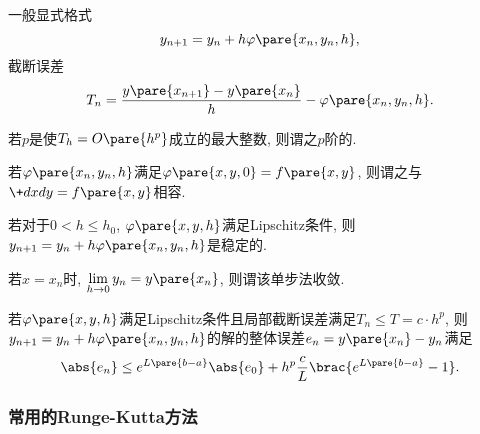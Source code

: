 \documentclass[hidelinks]{ctexart}
\begin{document}
一般显式格式
\[ y_{n+1} = y_n + h\varphi\pare{x_n,y_n,h}, \]
截断误差
\[ T_n = \frac{y\pare{x_{n+1}} - y\pare{x_n}}{h} - \varphi\pare{x_n,y_n,h}. \]
\begin{definition}
    若$p$是使$T_h = O\pare{h^p}$成立的最大整数, 则谓之$p$阶的.
\end{definition}
\begin{definition}
    若$\varphi\pare{x_n,y_n,h}$满足$\varphi\pare{x,y,0} = f\pare{x,y}$, 则谓之与$\+dxdy = f\pare{x,y}$相容.
\end{definition}
\begin{theorem}
    若对于$0<h\le h_0$, $\varphi\pare{x,y,h}$满足Lipschitz条件, 则$y_{n+1} = y_n + h\varphi\pare{x_n,y_n,h}$是稳定的.
\end{theorem}
\begin{definition}
    若$x=x_n$时, $\displaystyle \lim_{h\rightarrow 0} y_n = y\pare{x_n}$, 则谓该单步法收敛.
\end{definition}
\begin{theorem}
    若$\varphi\pare{x,y,h}$满足Lipschitz条件且局部截断误差满足$T_n \le T = c\cdot h^p$, 则$y_{n+1} = y_n + h\varphi\pare{x_n,y_n,h}$的解的整体误差$e_n = y\pare{x_n} - y_n$满足
    \[ \abs{e_n} \le e^{L\pare{b-a}}\abs{e_0} + h^p \frac{c}{L}\brac{e^{L\pare{b-a}}-1}. \]
\end{theorem}


\subsubsection{常用的Runge-Kutta方法} %
\label{ssub:常用的runge_kutta方法}
\end{document}
